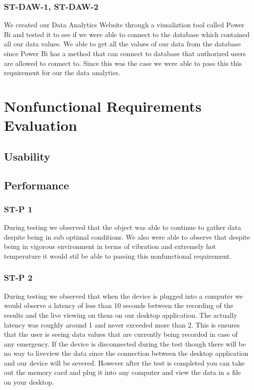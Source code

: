 \documentclass[12pt, titlepage]{article}
\begin{document}
\subsubsection{ST-DAW-1, ST-DAW-2}
We created our Data Analytics Website through a viusaliztion tool called Power Bi and tested it to see if we were able to connect to the database which contained all our data values. We able to get all the values of our data from the database since Power Bi has a method that can connect to database that authorized users are allowed to connect to. Since this was the case we were able to pass this this requirement for our the data analytics.


\section{Nonfunctional Requirements Evaluation}
\subsection{Usability}

\subsection{Performance}
\subsubsection{ST-P 1}
During testing we observed that the object was able to continue to gather data despite being in sub optimal conditions. We also were able to observe that despite being in vigorous environment in terms of vibration and extremely hot temperature it would stil be able to passing this nonfunctional requirement.

\subsubsection{ST-P 2}
During testing we observed that when the device is plugged into a computer we would observe a latency of less than 10 seconds between the recording of the results and the live viewing on them on our desktop application. The actually latency was roughly around 1 and never exceeded more than 2. This is ensures that the user is seeing data values that are currently being recorded in case of any emergency. If the device is disconnected during the test though there will be no way to liveview the data since the connection between the desktop application and our device will be severed. However after the test is completed you can take out the memory card and plug it into any computer and view the data in a file on your desktop.
\end{document}
